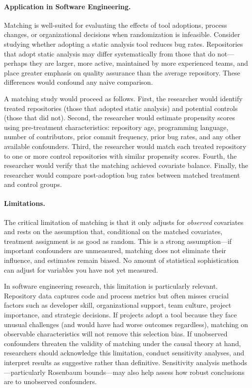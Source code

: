 \paragraph{Application in Software Engineering.}
Matching is well-suited for evaluating the effects of tool adoptions, process changes, or organizational decisions when randomization is infeasible.
Consider studying whether adopting a static analysis tool reduces bug rates.
Repositories that adopt static analysis may differ systematically from those that do not---perhaps they are larger, more active, maintained by more experienced teams, and place greater emphasis on quality assurance than the average repository.
These differences would confound any naive comparison.

A matching study would proceed as follows.
First, the researcher would identify treated repositories (those that adopted static analysis) and potential controls (those that did not).
Second, the researcher would estimate propensity scores using pre-treatment characteristics: repository age, programming language, number of contributors, prior commit frequency, prior bug rates, and any other available confounders.
Third, the researcher would match each treated repository to one or more control repositories with similar propensity scores.
Fourth, the researcher would verify that the matching achieved covariate balance.
Finally, the researcher would compare post-adoption bug rates between matched treatment and control groups.

\paragraph{Limitations.}
The critical limitation of matching is that it only adjusts for \emph{observed} covariates and rests on the assumption that, conditional on the matched covariates, treatment assignment is as good as random.
This is a strong assumption---if important confounders are unmeasured, matching does not eliminate their influence, and estimates remain biased.
No amount of statistical sophistication can adjust for variables you have not yet measured.

In software engineering research, this limitation is particularly relevant.
Repository data captures code and process metrics but often misses crucial factors such as developer skill, organizational support, team culture, project importance, and strategic decisions.
If projects adopt a tool because they face unusual challenges (and would have had worse outcomes regardless), matching on observable characteristics will not remove this selection bias.
If unobserved confounders threaten the validity of matching under the causal theory at hand, researchers should acknowledge this limitation, conduct sensitivity analyses, and interpret results as suggestive rather than definitive.
Sensitivity analysis methods---particularly Rosenbaum bounds---may also help assess how robust conclusions are to unobserved confounders.

